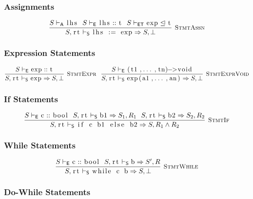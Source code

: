 \documentclass{article}
\newcommand{\code}[1]{\lstinline[columns=fixed]{#1}}
\newcommand{\drmrule}[5]{\frac{#1}{#2\vdash_{\mathsf{#3}}#4}\textsc{\ \small{#5}}}
\newcommand{\ruleapp}[1]{\vdash_{\mathsf{#1}}}
\newcommand{\mc}[1]{\textnormal{\code{#1}}}
\begin{document}
			\subsubsection{Assignments}
			
				\begin{align*}
					\drmrule{S\ruleapp{A}\mc{lhs}\ \ S\ruleapp{E}\mc{lhs} :: \mc{t}\ \ S\ruleapp{ET}\mc{exp} \trianglelefteq \mc{t}}{S,\mc{rt}}{S}{\mc{lhs := exp} \Rightarrow S,\bot}{StmtAssn}
				\end{align*}
			
			\subsubsection{Expression Statements}
			
				\begin{align*}
					\drmrule{S\ruleapp{E}\mc{exp} :: \mc{t}}{S,\mc{rt}}{S}{\mc{exp} \Rightarrow S,\bot}{StmtExpr}\ \ \drmrule{S\ruleapp{E}\mc{(t1,...,tn)->void}}{S,\mc{rt}}{S}{\mc{exp(a1,...,an)} \Rightarrow S,\bot}{StmtExprVoid}
				\end{align*}
			
			\subsubsection{If Statements}
			
				\begin{align*}
					\drmrule{S\ruleapp{E}\mc{c} :: \mc{bool}\ \ S,\mc{rt}\ruleapp{S}\mc{b1}\Rightarrow S_1,R_1\ \ S,\mc{rt}\ruleapp{S}\mc{b2}\Rightarrow S_2,R_2}{S,\mc{rt}}{S}{\mc{if c b1 else b2} \Rightarrow S,R_1\wedge R_2}{StmtIf}
				\end{align*}
			
			\subsubsection{While Statements}
			
				\begin{align*}
					\drmrule{S\ruleapp{E}\mc{c} :: \mc{bool}\ \ S,\mc{rt}\ruleapp{S}\mc{b}\Rightarrow S',R}{S,\mc{rt}}{S}{\mc{while c b} \Rightarrow S,\bot}{StmtWhile}
				\end{align*}
			
			\subsubsection{Do-While Statements}
			
\end{document}

